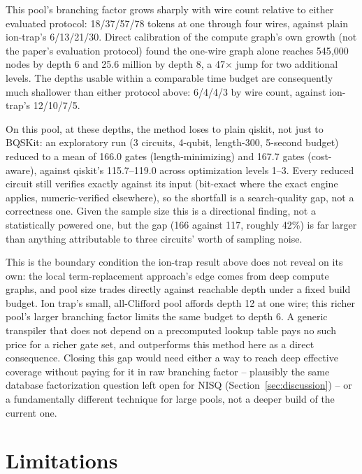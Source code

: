 \documentclass[11pt]{article}
\begin{document}
This pool's branching factor grows sharply with wire count relative to
either evaluated protocol: 18/37/57/78 tokens at one through four wires,
against plain ion-trap's 6/13/21/30. Direct calibration of the compute
graph's own growth (not the paper's evaluation protocol) found the
one-wire graph alone reaches 545{,}000 nodes by depth 6 and 25.6 million by
depth 8, a 47$\times$ jump for two additional levels. The depths usable
within a comparable time budget are consequently much shallower than
either protocol above: 6/4/4/3 by wire count, against ion-trap's 12/10/7/5.

On this pool, at these depths, the method loses to plain qiskit, not just
to BQSKit: an exploratory run (3 circuits, 4-qubit, length-300, 5-second
budget) reduced to a mean of 166.0 gates (length-minimizing) and 167.7
gates (cost-aware), against qiskit's 115.7--119.0 across optimization
levels 1--3. Every reduced circuit still verifies exactly against its
input (bit-exact where the exact engine applies, numeric-verified
elsewhere), so the shortfall is a search-quality gap, not a correctness
one. Given the sample size this is a directional finding, not a
statistically powered one, but the gap (166 against 117, roughly 42\%) is
far larger than anything attributable to three circuits' worth of sampling
noise.

This is the boundary condition the ion-trap result above does not reveal
on its own: the local term-replacement approach's edge comes from deep
compute graphs, and pool size trades directly against reachable depth
under a fixed build budget. Ion trap's small, all-Clifford pool affords
depth 12 at one wire; this richer pool's larger branching factor limits
the same budget to depth 6. A generic transpiler that does not depend on a
precomputed lookup table pays no such price for a richer gate set, and
outperforms this method here as a direct consequence. Closing this gap
would need either a way to reach deep effective coverage without paying
for it in raw branching factor -- plausibly the same database
factorization question left open for NISQ (Section~\ref{sec:discussion})
-- or a fundamentally different technique for large pools, not a deeper
build of the current one.

\section{Limitations}
\end{document}
